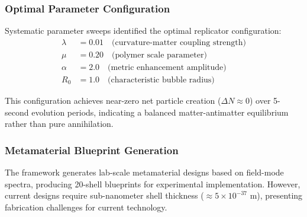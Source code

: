\documentclass[12pt]{article}
\begin{document}
\subsubsection{Optimal Parameter Configuration}

Systematic parameter sweeps identified the optimal replicator configuration:
\begin{align}
\lambda &= 0.01 \quad \text{(curvature-matter coupling strength)} \\
\mu &= 0.20 \quad \text{(polymer scale parameter)} \\
\alpha &= 2.0 \quad \text{(metric enhancement amplitude)} \\
R_0 &= 1.0 \quad \text{(characteristic bubble radius)}
\end{align}

This configuration achieves near-zero net particle creation ($\Delta N \approx 0$) over 5-second evolution periods, indicating a balanced matter-antimatter equilibrium rather than pure annihilation.

\subsubsection{Metamaterial Blueprint Generation}

The framework generates lab-scale metamaterial designs based on field-mode spectra, producing 20-shell blueprints for experimental implementation. However, current designs require sub-nanometer shell thickness ($\approx 5 \times 10^{-37}$ m), presenting fabrication challenges for current technology.
\end{document}
